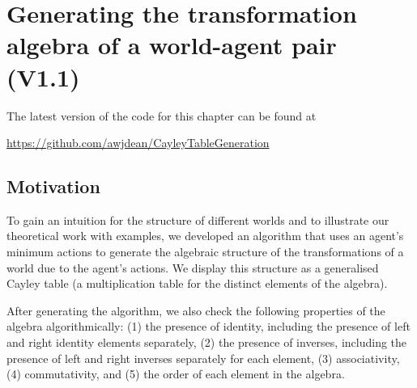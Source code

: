 \chapter{
Generating the transformation algebra of a world-agent pair
(V1.1)
}

The latest version of the code for this chapter can be found at
\begin{center}
\url{https://github.com/awjdean/CayleyTableGeneration}
\end{center}

\section{Motivation}

To gain an intuition for the structure of different worlds and to illustrate our theoretical work with examples, we developed an algorithm that uses an agent’s minimum actions to generate the algebraic structure of the transformations of a world due to the agent's actions.
We display this structure as a generalised Cayley table (a multiplication table for the distinct elements of the algebra).

After generating the algorithm, we also check the following properties of the algebra algorithmically: (1) the presence of identity, including the presence of left and right identity elements separately, (2) the presence of inverses, including the presence of left and right inverses separately for each element, (3) associativity, (4) commutativity, and (5) the order of each element in the algebra.


